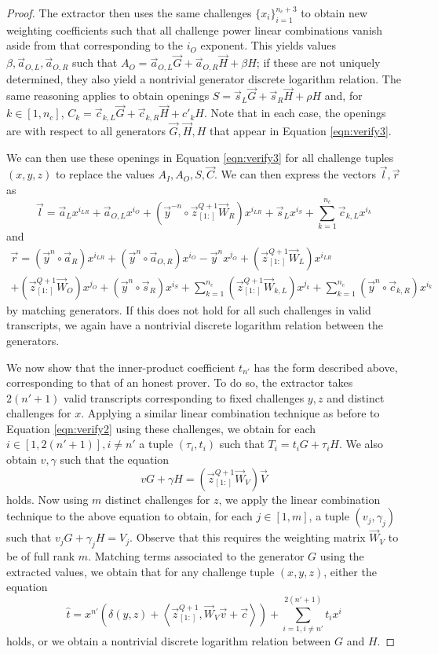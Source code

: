 \documentclass{article}
\newcommand{\mat}[1]{\vec{#1}}
\newcommand{\zq}{\vec{z}^{Q+1}_{[1:]}}
\begin{document}
\begin{proof}
	The extractor then uses the same challenges $\{ x_i \}_{i=1}^{n_c + 3}$ to obtain new weighting coefficients such that all challenge power linear combinations vanish aside from that corresponding to the $i_O$ exponent.
	This yields values $\beta, \vec{a}_{O,L}, \vec{a}_{O,R}$ such that $A_O = \vec{a}_{O,L} \vec{G} + \vec{a}_{O,R} \vec{H} + \beta H$; if these are not uniquely determined, they also yield a nontrivial generator discrete logarithm relation.
	The same reasoning applies to obtain openings $S = \vec{s}_L \vec{G} + \vec{s}_R \vec{H} + \rho H$ and, for $k \in [1, n_c]$, $C_k = \vec{c}_{k,L} \vec{G} + \vec{c}_{k,R} \vec{H} + c'_k H$.
	Note that in each case, the openings are with respect to all generators $\vec{G}, \vec{H}, H$ that appear in Equation \ref{eqn:verify3}.

	We can then use these openings in Equation \ref{eqn:verify3} for all challenge tuples $(x, y, z)$ to replace the values $A_I, A_O, S, \vec{C}$.
	We can then express the vectors $\vec{l}, \vec{r}$ as
	$$\vec{l} = \vec{a}_L x^{i_{LR}} + \vec{a}_{O,L} x^{i_O} + \left( \vec{y}^{-n} \circ \zq \mat{W}_R \right) x^{i_{LR}} + \vec{s}_L x^{i_S} + \sum_{k=1}^{n_c} \vec{c}_{k,L} x^{i_k}$$
	and
	\begin{multline*}
	\vec{r} = \left( \vec{y}^n \circ \vec{a}_R \right) x^{i_{LR}} + \left( \vec{y}^n \circ \vec{a}_{O,R} \right) x^{i_O} - \vec{y}^n x^{j_O} + \left( \zq \mat{W}_L \right) x^{i_{LR}} \\
	+ \left( \zq \mat{W}_O \right) x^{j_O} + \left( \vec{y}^n \circ \vec{s}_R \right) x^{i_S} + \sum_{k=1}^{n_c} \left( \zq \mat{W}_{k,L} \right) x^{j_k} + \sum_{k=1}^{n_c} \left( \vec{y}^n \circ \vec{c}_{k,R} \right) x^{i_k}
	\end{multline*}
	by matching generators.
	If this does not hold for all such challenges in valid transcripts, we again have a nontrivial discrete logarithm relation between the generators.

	We now show that the inner-product coefficient $t_{n'}$ has the form described above, corresponding to that of an honest prover.
	To do so, the extractor takes $2(n' + 1)$ valid transcripts corresponding to fixed challenges $y, z$ and distinct challenges for $x$.
	Applying a similar linear combination technique as before to Equation \ref{eqn:verify2} using these challenges, we obtain for each $i \in [1, 2(n' + 1)], i \neq n'$ a tuple $(\tau_i, t_i)$ such that $T_i = t_i G + \tau_i H$.
	We also obtain $v, \gamma$ such that the equation
	$$v G + \gamma H = \left( \zq \mat{W}_V \right) \vec{V}$$
	holds.
	Now using $m$ distinct challenges for $z$, we apply the linear combination technique to the above equation to obtain, for each $j \in [1,m]$, a tuple $(v_j, \gamma_j)$ such that $v_j G + \gamma_j H = V_j$.
	Observe that this requires the weighting matrix $\mat{W}_V$ to be of full rank $m$.
	Matching terms associated to the generator $G$ using the extracted values, we obtain that for any challenge tuple $(x, y, z)$, either the equation
	$$\widehat{t} = x^{n'} \left( \delta(y, z) + \left\langle \zq, \mat{W}_V \vec{v} + \vec{c} \right\rangle \right) + \sum_{i=1, i \neq n'}^{2(n' + 1)} t_i x^i$$
	holds, or we obtain a nontrivial discrete logarithm relation between $G$ and $H$.


\end{proof}
\end{document}
